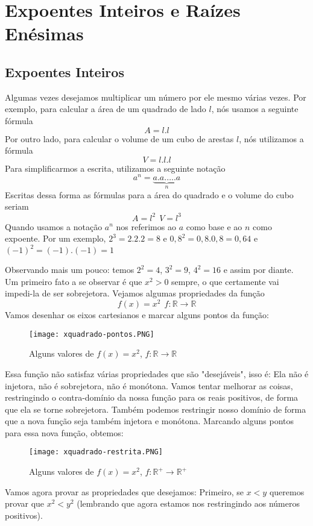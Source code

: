 \chapter{Expoentes Inteiros e Raízes Enésimas}
\section{Expoentes Inteiros}
Algumas vezes desejamos multiplicar um número por ele mesmo várias vezes. Por exemplo, para calcular a área de um quadrado de lado $l$, nós usamos a seguinte fórmula $$A = l.l$$Por outro lado, para calcular o volume de um cubo de arestas $l$, nós utilizamos a fórmula $$V= l.l.l$$Para simplificarmos a escrita, utilizamos a seguinte notação
$$a^n = \underbrace{a.a.\ldots.a}_{n}$$
Escritas dessa forma as fórmulas para a área do quadrado e o volume do cubo seriam $$A= l^2 \ \ V = l^3$$Quando usamos a notação $a^n$ nos referimos ao $a$ como base e ao $n$ como expoente.
Por um exemplo, $2^3 = 2.2.2 = 8$ e $0,8^2 = 0,8 . 0, 8 = 0,64$ e $(-1)^2 = (-1).(-1) = 1$

Observando mais um pouco: temos $2^2= 4$, $3^2 = 9$, $4^2 = 16$ e assim por diante. Um primeiro fato a se observar é que $x^2>0$ sempre, o que certamente vai impedi-la de ser sobrejetora. Vejamos algumas propriedades da função $$f(x) = x^2 \ \ f \colon \mathbb{R} \to \mathbb{R}$$Vamos desenhar os eixos cartesianos e marcar alguns pontos da função:

\begin{figure}[h]
	\centering
		\texttt{[image: xquadrado-pontos.PNG]}
		\caption{Alguns valores de $f(x)=x^2$, $f\colon \mathbb{R}\to\mathbb{R}$}
	\label{fig:xquadrado-pontos}
\end{figure}
Essa função não satisfaz várias propriedades que são "desejáveis", isso é: Ela não é injetora, não é sobrejetora, não é monótona. Vamos tentar melhorar as coisas, restringindo o contra-domínio da nossa função para os reais positivos, de forma que ela se torne sobrejetora. Também podemos restringir nosso domínio de forma que a nova função seja também injetora e monótona. Marcando alguns pontos para essa nova função, obtemos:

\begin{figure}[h]
	\centering
		\texttt{[image: xquadrado-restrita.PNG]}
		\caption{Alguns valores de $f(x)=x^2$, $f\colon \mathbb{R}^+ \to \mathbb{R}^+$}
	\label{fig:xquadrado-restrita}
\end{figure}

Vamos agora provar as propriedades que desejamos: Primeiro, se $x<y$ queremos provar que $x^2<y^2$ (lembrando que agora estamos nos restringindo aos números positivos). 


